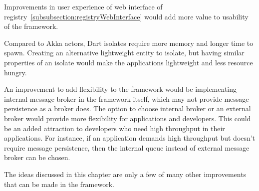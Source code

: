   Improvements in user experience of web interface of registry~\autoref{subsubsection:registryWebInterface} would add more value to usability of the framework.

  Compared to Akka actors, Dart isolates require more memory and longer time to spawn. Creating an alternative lightweight entity to isolate, but having similar properties of an isolate would make the applications lightweight and less resource hungry.

  An improvement to add flexibility to the framework would be implementing internal message broker in the framework itself, which may not provide message persistence as a broker does. The option to choose internal broker or an external broker would provide more flexibility for applications and developers. This could be an added attraction to developers who need high throughput in their applications.
  For instance, if an application demands high throughput but doesn't require message persistence, then the internal queue instead of external message broker can be chosen.

  The ideas discussed in this chapter are only a few of many other improvements that can be made in the framework.
